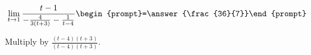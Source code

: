 \documentclass{ximera}
\author{Bart Snapp}
\begin{document}
\begin{exercise}

\[
\lim_{t\to 1 } \frac{t-1}{-\frac{4}{3 (t+3)}-\frac{1}{t-4}}  \begin{prompt}=\answer{\frac{36}{7}}\end{prompt}
\]
\begin{hint}
Multiply by $\frac{(t-4) (t+3)}{(t-4) (t+3)}$.
\end{hint}
\end{exercise}
\end{document}
